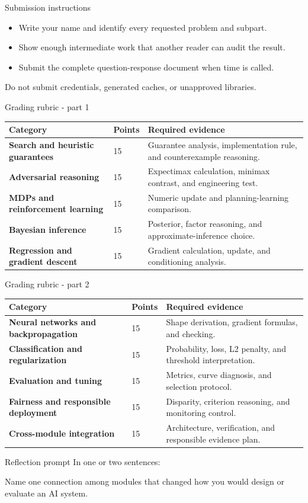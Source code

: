\documentclass[aspectratio=169,11pt]{beamer}
\begin{document}
\begin{frame}{Submission instructions}
\small
\begin{itemize}
  \item Write your name and identify every requested problem and subpart.
  \item Show enough intermediate work that another reader can audit the result.
  \item Submit the complete question-response document when time is called.
\end{itemize}
\vspace{0.2cm}
\alert{Do not submit credentials, generated caches, or unapproved libraries.}
\end{frame}

\begin{frame}{Grading rubric - part 1}
\scriptsize
\begin{tabularx}{\textwidth}{>{\bfseries}p{} p{} X}
\toprule
Category & Points & Required evidence \\
\midrule
Search and heuristic guarantees & 15 & Guarantee analysis, implementation rule, and counterexample reasoning. \\
Adversarial reasoning & 15 & Expectimax calculation, minimax contrast, and engineering test. \\
MDPs and reinforcement learning & 15 & Numeric update and planning-learning comparison. \\
Bayesian inference & 15 & Posterior, factor reasoning, and approximate-inference choice. \\
Regression and gradient descent & 15 & Gradient calculation, update, and conditioning analysis. \\
\bottomrule
\end{tabularx}
\end{frame}

\begin{frame}{Grading rubric - part 2}
\scriptsize
\begin{tabularx}{\textwidth}{>{\bfseries}p{} p{} X}
\toprule
Category & Points & Required evidence \\
\midrule
Neural networks and backpropagation & 15 & Shape derivation, gradient formulas, and checking. \\
Classification and regularization & 15 & Probability, loss, L2 penalty, and threshold interpretation. \\
Evaluation and tuning & 15 & Metrics, curve diagnosis, and selection protocol. \\
Fairness and responsible deployment & 15 & Disparity, criterion reasoning, and monitoring control. \\
Cross-module integration & 15 & Architecture, verification, and responsible evidence plan. \\
\bottomrule
\end{tabularx}
\end{frame}

\begin{frame}{Reflection prompt}
In one or two sentences:

Name one connection among modules that changed how you would design or evaluate an AI system.
\end{frame}
\end{document}
